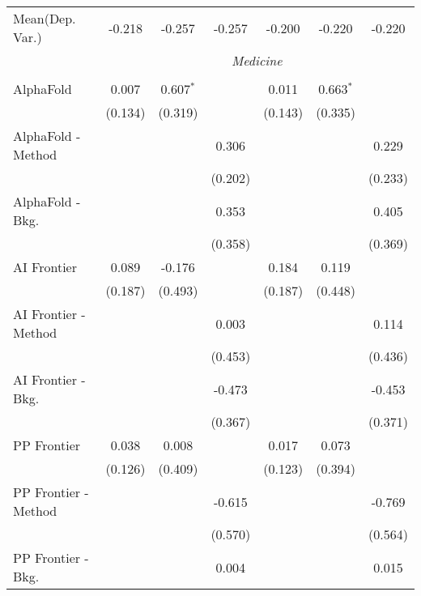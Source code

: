 \begin{tabular}{lcccccc}
Mean(Dep. Var.) & -0.218 & -0.257 & -0.257 & -0.200 & -0.220 & -0.220 \\
 & \multicolumn{6}{c}{\textit{Medicine}} \\ \\
   AlphaFold            & 0.007   & 0.607$^{*}$  &              & 0.011   & 0.663$^{*}$ &   \\   
                        & (0.134) & (0.319)      &              & (0.143) & (0.335)     &   \\   
   AlphaFold - Method   &         &              & 0.306        &         &             & 0.229\\   
                        &         &              & (0.202)      &         &             & (0.233)\\   
   AlphaFold - Bkg.     &         &              & 0.353        &         &             & 0.405\\   
                        &         &              & (0.358)      &         &             & (0.369)\\   
   AI Frontier          & 0.089   & -0.176       &              & 0.184   & 0.119       &   \\   
                        & (0.187) & (0.493)      &              & (0.187) & (0.448)     &   \\   
   AI Frontier - Method &         &              & 0.003        &         &             & 0.114\\   
                        &         &              & (0.453)      &         &             & (0.436)\\   
   AI Frontier - Bkg.   &         &              & -0.473       &         &             & -0.453\\   
                        &         &              & (0.367)      &         &             & (0.371)\\   
   PP Frontier          & 0.038   & 0.008        &              & 0.017   & 0.073       &   \\   
                        & (0.126) & (0.409)      &              & (0.123) & (0.394)     &   \\   
   PP Frontier - Method &         &              & -0.615       &         &             & -0.769\\   
                        &         &              & (0.570)      &         &             & (0.564)\\   
   PP Frontier - Bkg.   &         &              & 0.004        &         &             & 0.015\\   

\end{tabular}
